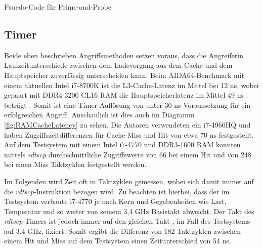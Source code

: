 
\begin{algorithm}[h]
\DontPrintSemicolon
\caption{Psuedo-Code für Prime-and-Probe}
\label{alg:prime_and_pribe}


\end{algorithm}




\subsection{Timer}

Beide eben beschrieben Angriffsmethoden setzen voraus, dass die Angreiferin Laufzeitunterschiede zwischen dem Ladevorgang aus dem Cache und dem Hauptspeicher zuverlässig unterscheiden kann. Beim AIDA64-Benchmark mit einem aktuellen Intel i7-8700K ist die L3-Cache-Latenz im Mittel bei 12 ns, wobei gepaart mit DDR4-3200 CL16 RAM die Hauptspeicherlatenz im Mittel 49 ns beträgt \cite{i78700kLatency}. Somit ist eine Timer-Auflösung von unter 30 ns Voraussetzung für ein erfolgreichen Angriff. Anschaulich ist dies auch im Diagramm \ref{fig:RAMCacheLatency} zu sehen. Die Autoren verwendeten ein i7-4960HQ und haben Zugriffszeitdifferenzen für Cache-Miss und Hit von etwa 70 ns festgestellt. 
Auf dem Testsystem mit einem Intel i7-4770 und DDR3-1600 RAM konnten mittels \textit{rdtscp} durchschnittliche Zugriffswerte von 66 bei einem Hit und von 248 bei einen Miss Taktzyklen festgestellt werden.

Im Folgenden wird Zeit oft in Taktzyklen gemessen, wobei sich damit immer auf die \textit{rdtscp}-Instruktion bezogen wird.
Zu beachten ist hierbei, dass der im Testsystem verbaute i7-4770 je nach Kern und Gegebenheiten wie Last, Temperatur und so weiter von seinem 3,4 GHz Basistakt abweicht.
Der Takt des \textit{rdtscp}-Timers ist jedoch immer auf den gleichen Takt \cite{IntelManualRDTSCP}, im Fall des Testsystems auf 3,4 GHz, fixiert.
Somit ergibt die Differenz von 182 Taktzyklen zwischen einem Hit und Miss auf dem Testsystem einen Zeitunterschied von 54 ns.

